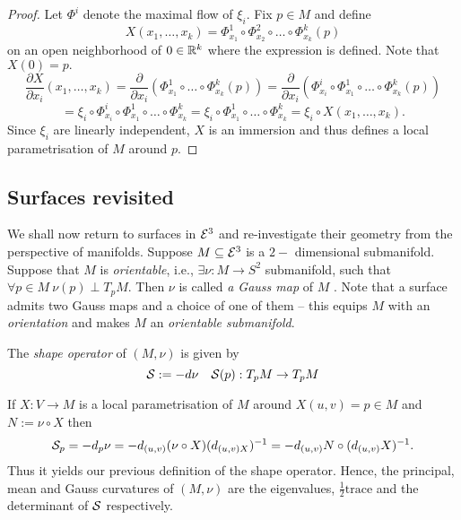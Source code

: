 \begin{proof}
	
	Let $ \Phi^i $ denote the maximal flow of $ \xi_i $. Fix $ p \in M $ and define 
		\[ X(x_1,\dots, x_k)= \Phi^1_{x_1}\circ \Phi^2_{x_2}\circ \dots \circ \Phi^k_{x_k}(p) \]
	on an open neighborhood of $ 0 \in \mathbb R^k $ where the expression is defined.
	Note that $ X(0)=p. $
		\[ \dfrac{\partial X}{\partial x_i}(x_1,\dots,x_k) = \dfrac{\partial}{\partial x_i} (\Phi^1_{x_1}\circ \dots \circ \Phi^k_{x_k}(p)) = \dfrac{\partial}{\partial x_i} (\Phi^i_{x_i} \circ \Phi^1_{x_1}\circ \dots \circ \Phi^k_{x_k}(p))  \]	
		\[ = \xi_i \circ \Phi^i_{x_i} \circ \Phi^1_{x_1} \circ \dots \circ \Phi^k_{x_k} = \xi_i \circ \Phi^1_{x_1} \circ \dots \circ \Phi^k_{x_k} = \xi_i \circ X(x_1, \dots, x_k).  \]
	Since $ \xi_i $ are linearly independent, $ X $ is an immersion and thus defines a local parametrisation of $ M $ around $ p $.
		
\end{proof}

\subsection{Surfaces revisited}

We shall now return to surfaces in $ \mathcal E^3 $ and re-investigate their geometry from the perspective of manifolds.
Suppose $ M \subseteq \mathcal E^3 $ is a $ 2- $ dimensional submanifold. Suppose that $ M $ is \emph{orientable}, i.e., $ \exists \nu: M \rightarrow S^2 $ submanifold, such that $ \forall p \in M ~ \nu(p) \perp T_pM $. Then $ \nu $ is called \emph{a Gauss map } of $ M $ . Note that a surface admits two Gauss maps and a choice of one of them -- this equips $ M $ with an \emph{orientation} and makes $ M $ an \emph{orientable submanifold}.

\begin{definition}
	
	The \emph{shape operator} of $ (M,\nu) $ is given by	
		\[ \mathcal S := -d\nu \quad \mathcal S(p):T_pM \rightarrow T_pM  \]
	
	
\end{definition}

\begin{remark}
	If $ X:V \rightarrow M $ is a local parametrisation of $ M $ around $ X(u,v)=p \in M $ and $ N:= \nu \circ X $ then 
		\[ \mathcal S_p = -d_p\nu = - d_{(u,v)}(\nu \circ X)(d_{(u,v)X})^{-1} = -d_{(u,v)}N \circ (d_{(u,v)}X)^{-1}. \]
	Thus it yields our previous definition of the shape operator. Hence, the principal, mean and Gauss curvatures of $ (M,\nu) $ are the eigenvalues, $ \frac{1}{2} \mathrm{trace} $ and the determinant of $ \mathcal S $ respectively.
\end{remark}


